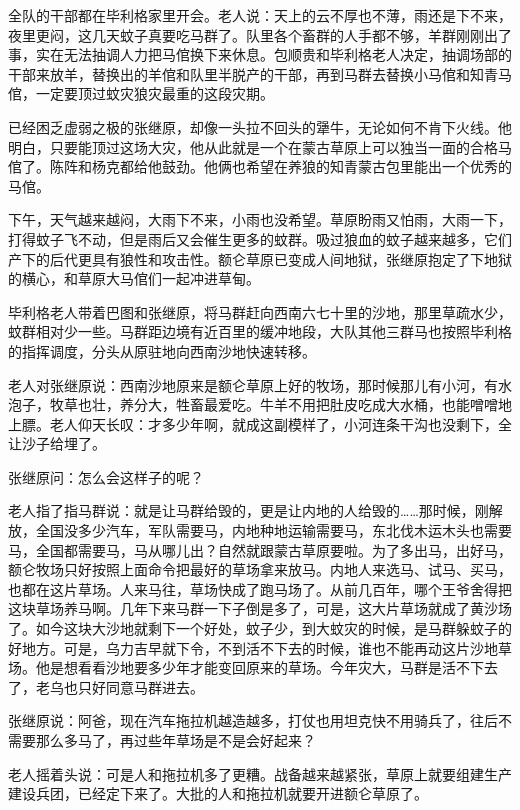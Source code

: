 \par 
\par 全队的干部都在毕利格家里开会。老人说：天上的云不厚也不薄，雨还是下不来，夜里更闷，这几天蚊子真要吃马群了。队里各个畜群的人手都不够，羊群刚刚出了事，实在无法抽调人力把马倌换下来休息。包顺贵和毕利格老人决定，抽调场部的干部来放羊，替换出的羊倌和队里半脱产的干部，再到马群去替换小马倌和知青马倌，一定要顶过蚊灾狼灾最重的这段灾期。
\par 已经困乏虚弱之极的张继原，却像一头拉不回头的犟牛，无论如何不肯下火线。他明白，只要能顶过这场大灾，他从此就是一个在蒙古草原上可以独当一面的合格马倌了。陈阵和杨克都给他鼓劲。他俩也希望在养狼的知青蒙古包里能出一个优秀的马倌。
\par 下午，天气越来越闷，大雨下不来，小雨也没希望。草原盼雨又怕雨，大雨一下，打得蚊子飞不动，但是雨后又会催生更多的蚊群。吸过狼血的蚊子越来越多，它们产下的后代更具有狼性和攻击性。额仑草原已变成人间地狱，张继原抱定了下地狱的横心，和草原大马倌们一起冲进草甸。
\par 毕利格老人带着巴图和张继原，将马群赶向西南六七十里的沙地，那里草疏水少，蚊群相对少一些。马群距边境有近百里的缓冲地段，大队其他三群马也按照毕利格的指挥调度，分头从原驻地向西南沙地快速转移。
\par 老人对张继原说：西南沙地原来是额仑草原上好的牧场，那时候那儿有小河，有水泡子，牧草也壮，养分大，牲畜最爱吃。牛羊不用把肚皮吃成大水桶，也能噌噌地上膘。老人仰天长叹：才多少年啊，就成这副模样了，小河连条干沟也没剩下，全让沙子给埋了。
\par 张继原问：怎么会这样子的呢？
\par 老人指了指马群说：就是让马群给毁的，更是让内地的人给毁的……那时候，刚解放，全国没多少汽车，军队需要马，内地种地运输需要马，东北伐木运木头也需要马，全国都需要马，马从哪儿出？自然就跟蒙古草原要啦。为了多出马，出好马，额仑牧场只好按照上面命令把最好的草场拿来放马。内地人来选马、试马、买马，也都在这片草场。人来马往，草场快成了跑马场了。从前几百年，哪个王爷舍得把这块草场养马啊。几年下来马群一下子倒是多了，可是，这大片草场就成了黄沙场了。如今这块大沙地就剩下一个好处，蚊子少，到大蚊灾的时候，是马群躲蚊子的好地方。可是，乌力吉早就下令，不到活不下去的时候，谁也不能再动这片沙地草场。他是想看看沙地要多少年才能变回原来的草场。今年灾大，马群是活不下去了，老乌也只好同意马群进去。
\par 张继原说：阿爸，现在汽车拖拉机越造越多，打仗也用坦克快不用骑兵了，往后不需要那么多马了，再过些年草场是不是会好起来？
\par 老人摇着头说：可是人和拖拉机多了更糟。战备越来越紧张，草原上就要组建生产建设兵团，已经定下来了。大批的人和拖拉机就要开进额仑草原了。
